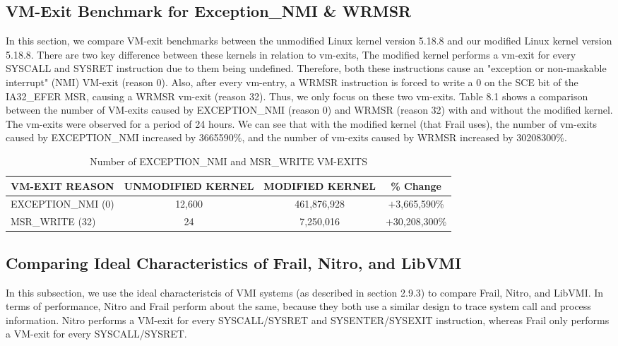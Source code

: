 \documentclass{report}
\begin{document}
\begin{spacing}{1.5}
\section{VM-Exit Benchmark for Exception\_NMI \& WRMSR}


{\large
In this section, we compare VM-exit benchmarks between the unmodified Linux kernel version 5.18.8 and our modified Linux kernel version 5.18.8. There are two key difference between these kernels in relation to vm-exits, The modified kernel performs a vm-exit for every SYSCALL and SYSRET instruction due to them being undefined. Therefore, both these instructions cause an "exception or non-maskable interrupt" (NMI) VM-exit (reason 0). Also, after every vm-entry, a WRMSR instruction is forced to write a 0 on the SCE bit of the IA32\_EFER MSR, causing a WRMSR vm-exit (reason 32). Thus, we only focus on these two vm-exits. Table 8.1 shows a comparison between the number of VM-exits caused by EXCEPTION\_NMI (reason 0) and WRMSR (reason 32) with and without the modified kernel. The vm-exits were observed for a period of 24 hours. We can see that with the modified kernel (that Frail uses), the number of vm-exits caused by EXCEPTION\_NMI increased by 3665590\%, and the number of vm-exits caused by WRMSR increased by 30208300\%.
\newline
}


\begin{table}[ht]
\centering
\caption{Number of EXCEPTION\_NMI and MSR\_WRITE VM-EXITS}
\begin{tabular}[t]{lccc}
\hline
VM-EXIT REASON&UNMODIFIED KERNEL&MODIFIED KERNEL&\% Change\\
\hline
EXCEPTION\_NMI (0) &12,600&461,876,928&$+$3,665,590\%\\
MSR\_WRITE (32) & 24 & 7,250,016&$+$30,208,300\%\\
\hline
\end{tabular}
\end{table}%





\subsection{Comparing Ideal Characteristics of Frail, Nitro, and LibVMI}

{\large
In this subsection, we use the ideal characteristcis of VMI systems (as described in section 2.9.3) to compare Frail, Nitro, and LibVMI. In terms of performance, Nitro and Frail perform about the same, because they both use a similar design to trace system call and process information. Nitro performs a VM-exit for every SYSCALL/SYSRET and SYSENTER/SYSEXIT instruction, whereas Frail only performs a VM-exit for every SYSCALL/SYSRET. 
\leavevmode\newline
}



\end{spacing}
\end{document}
